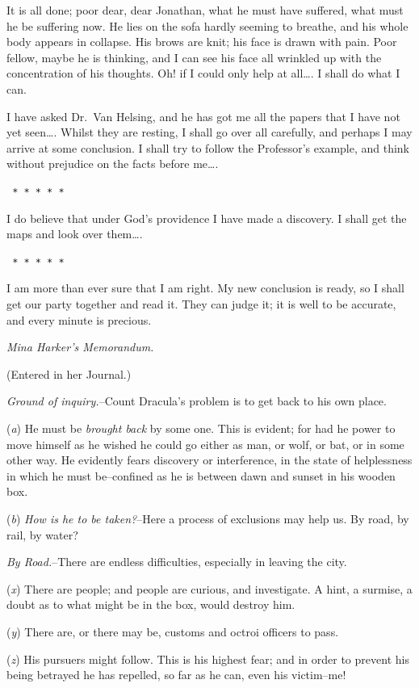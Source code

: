 \documentclass[12pt,openright]{book}
\begin{document}
It is all done; poor dear, dear Jonathan, what he must have suffered, what must he be suffering now. He lies on the sofa hardly seeming to breathe, and his whole body appears in collapse. His brows are knit; his face is drawn with pain. Poor fellow, maybe he is thinking, and I can see his face all wrinkled up with the concentration of his thoughts. Oh! if I could only help at all…. I shall do what I can.

I have asked Dr. Van Helsing, and he has got me all the papers that I have not yet seen…. Whilst they are resting, I shall go over all carefully, and perhaps I may arrive at some conclusion. I shall try to follow the Professor’s example, and think without prejudice on the facts before me….

\texttt{   *       *       *       *       *}

I do believe that under God’s providence I have made a discovery. I shall get the maps and look over them….

\texttt{   *       *       *       *       *}

I am more than ever sure that I am right. My new conclusion is ready, so I shall get our party together and read it. They can judge it; it is well to be accurate, and every minute is precious.

\textit{Mina Harker’s Memorandum.}

(Entered in her Journal.)

\textit{Ground of inquiry.}–Count Dracula’s problem is to get back to his own place.

(\textit{a}) He must be \textit{brought back} by some one. This is evident; for had he power to move himself as he wished he could go either as man, or wolf, or bat, or in some other way. He evidently fears discovery or interference, in the state of helplessness in which he must be–confined as he is between dawn and sunset in his wooden box.

(\textit{b}) \textit{How is he to be taken?}–Here a process of exclusions may help us. By road, by rail, by water?

\textit{By Road.}–There are endless difficulties, especially in leaving the city.

(\textit{x}) There are people; and people are curious, and investigate. A hint, a surmise, a doubt as to what might be in the box, would destroy him.

(\textit{y}) There are, or there may be, customs and octroi officers to pass.

(\textit{z}) His pursuers might follow. This is his highest fear; and in order to prevent his being betrayed he has repelled, so far as he can, even his victim–me!
\end{document}
